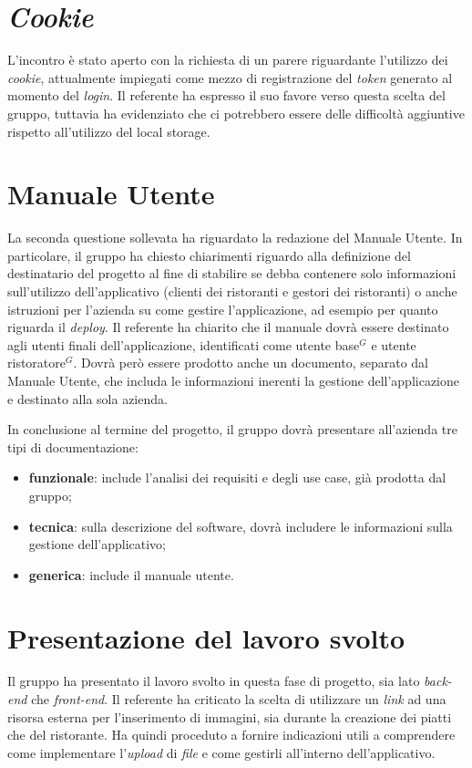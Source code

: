 \section{\textit{Cookie}}

L'incontro è stato aperto con la richiesta di un parere riguardante l'utilizzo 
dei \textit{cookie}, attualmente impiegati come mezzo di registrazione del 
\textit{token} generato al momento del \textit{login}. 
Il referente ha espresso il suo favore verso questa scelta del gruppo, tuttavia 
ha evidenziato che ci potrebbero essere delle difficoltà aggiuntive rispetto 
all'utilizzo del local storage.

\section{Manuale Utente}

La seconda questione sollevata ha riguardato la redazione del Manuale Utente. 
In particolare, il gruppo ha chiesto chiarimenti riguardo alla definizione del 
destinatario del progetto al fine di stabilire se debba contenere solo 
informazioni sull'utilizzo dell'applicativo (clienti dei ristoranti e gestori
dei ristoranti) o anche istruzioni per l'azienda su come gestire l'applicazione, 
ad esempio per quanto riguarda il \textit{deploy}. 
Il referente ha chiarito che il manuale dovrà essere destinato agli utenti 
finali dell'applicazione, identificati come utente base$^G$ e utente 
ristoratore$^G$.
Dovrà però essere prodotto anche un documento, separato dal Manuale Utente, che 
includa le informazioni inerenti la gestione dell'applicazione e destinato alla 
sola azienda.

In conclusione al termine del progetto, il gruppo dovrà presentare all'azienda 
tre tipi di documentazione:
\begin{itemize}
    \item \textbf{funzionale}: include l'analisi dei requisiti e degli use case, 
		già prodotta dal gruppo;
    \item \textbf{tecnica}: sulla descrizione del software, dovrà includere le 
		informazioni sulla gestione dell'applicativo;
    \item \textbf{generica}: include il manuale utente.
\end{itemize}

\section{Presentazione del lavoro svolto}

Il gruppo ha presentato il lavoro svolto in questa fase di progetto, sia lato 
\textit{back-end} che \textit{front-end}.
Il referente ha criticato la scelta di utilizzare un \textit{link} ad una 
risorsa esterna per l'inserimento di immagini, sia durante la creazione dei 
piatti che del ristorante.
Ha quindi proceduto a fornire indicazioni utili a comprendere come implementare 
l'\textit{upload} di \textit{file} e come gestirli all'interno dell'applicativo.
